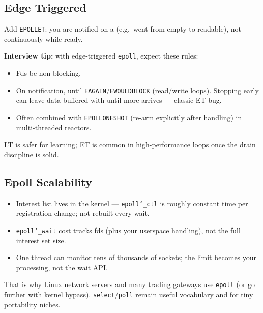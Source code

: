\subsection{Edge Triggered}
\label{subsec:epoll-edge-triggered}
Add \texttt{EPOLLET}: you are notified on a  (e.g.\ went from 
empty to readable), not continuously while ready.
\par\noindent\textbf{Interview tip:} with edge-triggered \texttt{epoll}, expect these rules:
\begin{itemize}
    \item Fds  be non-blocking.
    \item On notification,  until \texttt{EAGAIN}/\texttt{EWOULDBLOCK} 
          (read/write loops). Stopping early can leave data buffered with  until more arrives --- classic ET bug.
    \item Often combined with \texttt{EPOLLONESHOT} (re-arm explicitly after handling) in 
          multi-threaded reactors.
\end{itemize}
LT is safer for learning; ET is common in high-performance loops once the drain discipline 
is solid.

\subsection{Epoll Scalability}
\label{subsec:epoll-scalability}
\begin{itemize}
    \item Interest list lives in the kernel --- \texttt{epoll\char`_ctl} is roughly constant 
          time per registration change; not rebuilt every wait.
    \item \texttt{epoll\char`_wait} cost tracks  fds (plus your userspace 
          handling), not the full interest set size.
    \item One thread can monitor tens of thousands of sockets; the limit becomes your 
          processing, not the wait API.
\end{itemize}
That is why Linux network servers and many trading gateways use \texttt{epoll} (or go further 
with kernel bypass). \texttt{select}/\texttt{poll} remain useful vocabulary and for tiny 
portability niches.

